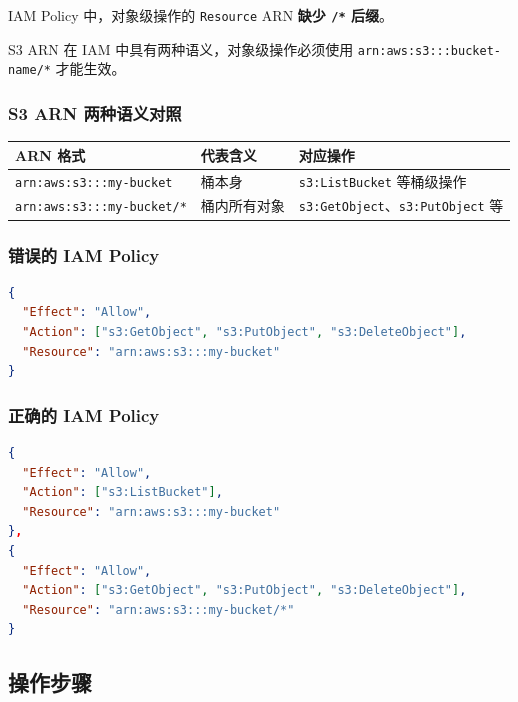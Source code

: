 \documentclass[12pt, a4paper]{article}
\begin{document}
\begin{rootcause}
IAM Policy 中，对象级操作的 \texttt{Resource} ARN \textbf{缺少 \texttt{/*} 后缀}。

S3 ARN 在 IAM 中具有两种语义，对象级操作必须使用 \texttt{arn:aws:s3:::bucket-name/*} 才能生效。
\end{rootcause}

\subsubsection{S3 ARN 两种语义对照}

\begin{center}
\begin{tabular}{lll}
\toprule
\textbf{ARN 格式} & \textbf{代表含义} & \textbf{对应操作} \\
\midrule
\texttt{arn:aws:s3:::my-bucket} & 桶本身 & \texttt{s3:ListBucket} 等桶级操作 \\
\texttt{arn:aws:s3:::my-bucket/*} & 桶内所有对象 & \texttt{s3:GetObject}、\texttt{s3:PutObject} 等 \\
\bottomrule
\end{tabular}
\end{center}

\subsubsection{错误的 IAM Policy}

\begin{lstlisting}[language=json, caption=错误配置（缺少 /*）]
{
  "Effect": "Allow",
  "Action": ["s3:GetObject", "s3:PutObject", "s3:DeleteObject"],
  "Resource": "arn:aws:s3:::my-bucket"
}
\end{lstlisting}

\subsubsection{正确的 IAM Policy}

\begin{lstlisting}[language=json, caption=正确配置]
{
  "Effect": "Allow",
  "Action": ["s3:ListBucket"],
  "Resource": "arn:aws:s3:::my-bucket"
},
{
  "Effect": "Allow",
  "Action": ["s3:GetObject", "s3:PutObject", "s3:DeleteObject"],
  "Resource": "arn:aws:s3:::my-bucket/*"
}
\end{lstlisting}

\subsection{操作步骤}
\end{document}
